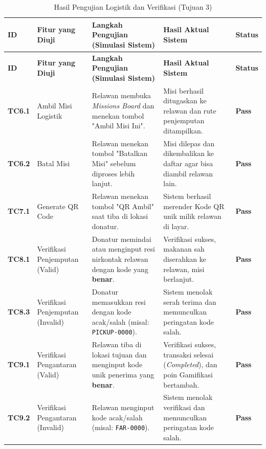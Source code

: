 \begin{longtable}{|>{\centering\arraybackslash}m{1.0cm}|p{2.3cm}|p{4.0cm}|p{4.0cm}|>{\centering\arraybackslash}m{1.2cm}|}
\caption{Hasil Pengujian Logistik dan Verifikasi (Tujuan 3)} \label{tab:hasil-tujuan3} \\
\hline
\rowcolor{gray!25}
\centering\textbf{ID} & \centering\textbf{Fitur yang Diuji} & \centering\textbf{Langkah Pengujian (Simulasi Sistem)} & \centering\textbf{Hasil Aktual Sistem} & \centering\arraybackslash\textbf{Status} \\ \hline
\endfirsthead

\hline
\rowcolor{gray!25}
\centering\textbf{ID} & \centering\textbf{Fitur yang Diuji} & \centering\textbf{Langkah Pengujian (Simulasi Sistem)} & \centering\textbf{Hasil Aktual Sistem} & \centering\arraybackslash\textbf{Status} \\ \hline
\endhead

\hline
\endfoot

\hline
\endlastfoot

\textbf{TC6.1} & Ambil Misi Logistik & Relawan membuka \textit{Missions Board} dan menekan tombol "Ambil Misi Ini". & Misi berhasil ditugaskan ke relawan dan rute penjemputan ditampilkan. & \textbf{Pass} \\ \hline
\textbf{TC6.2} & Batal Misi & Relawan menekan tombol "Batalkan Misi" sebelum diproses lebih lanjut. & Misi dilepas dan dikembalikan ke daftar agar bisa diambil relawan lain. & \textbf{Pass} \\ \hline
\textbf{TC7.1} & Generate QR Code & Relawan menekan tombol "QR Ambil" saat tiba di lokasi donatur. & Sistem berhasil merender Kode QR unik milik relawan di layar. & \textbf{Pass} \\ \hline
\textbf{TC8.1} & Verifikasi Penjemputan (Valid) & Donatur memindai atau menginput resi nirkontak relawan dengan kode yang \textbf{benar}. & Verifikasi sukses, makanan sah diserahkan ke relawan, misi berlanjut. & \textbf{Pass} \\ \hline
\textbf{TC8.3} & Verifikasi Penjemputan (Invalid) & Donatur memasukkan resi dengan kode acak/salah (misal: \texttt{PICKUP-0000}). & Sistem menolak serah terima dan memunculkan peringatan kode salah. & \textbf{Pass} \\ \hline
\textbf{TC9.1} & Verifikasi Pengantaran (Valid) & Relawan tiba di lokasi tujuan dan menginput kode unik penerima yang \textbf{benar}. & Verifikasi sukses, transaksi selesai (\textit{Completed}), dan poin Gamifikasi bertambah. & \textbf{Pass} \\ \hline
\textbf{TC9.2} & Verifikasi Pengantaran (Invalid) & Relawan menginput kode acak/salah (misal: \texttt{FAR-0000}). & Sistem menolak verifikasi dan memunculkan peringatan kode salah. & \textbf{Pass} \\ \hline
\end{longtable}

